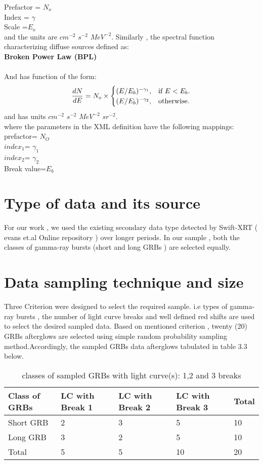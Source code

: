 Prefactor = $N_{o}$\\
Index = $\gamma$\\
Scale =$E_{o}$\\
and the units are $ cm^{-2} $ $s^{-2}$ $ MeV^{-2} $. Similarly , the spectral function characterizing  diffuse sources defined as:\\
\textbf{ Broken Power Law (BPL) }\\\\
And has function of  the form:
\begin{equation}
  \frac{dN}{dE}= N_{o} \times\begin{cases} 
    (E/E_{b}) ^{-\gamma_{1}}, & \text{if $ E < E_{b}$}.\\
    (E/E_{b})^{-\gamma_{2}}, & \text{otherwise}.
  \end{cases}
\end{equation}
and has units $ cm^{-2} $ $s^{-2}$ $ MeV^{-2} $ $ sr^{-2} $.\\
where the parameters in the XML definition have the following mappings:\\
   prefactor= $N_{O}$\\
$ index_{1}$= $\gamma_1 $\\
$index_{2}$= $\gamma_2 $\\
Break value=$ E_b $\\	
\section{Type of data  and its source }
For  our  work , we used  the existing  secondary data type  detected by  Swift-XRT   ( evans et.al Online repository )  over longer periods. In our sample , both the classes of gamma-ray bursts (short and long GRBs ) are selected equally. 
\section{Data sampling technique and size}
Three Criterion were  designed to select the required sample. i.e  types of gamma-ray bursts , the number of light curve breaks and well defined red shifts are used to select the desired sampled  data. Based on mentioned criterion ,  twenty (20) GRBs afterglows are selected using  simple random probability sampling method.Accordingly, the  sampled  GRBs data  afterglows  tabulated in table 3.3 below.
\begin{center}
	\begin{table}
		\caption { classes of sampled GRBs with light curve(s): 1,2 and 3 breaks }
		\begin{tabular}{|l|l|l|l|l|}
			\hline
			Class of GRBs & LC with Break 1 & LC with Break 2 & LC with Break 3 & Total \\ \hline
			Short GRB & 2 & 3 & 5 & 10 \\ \hline
			Long GRB & 3 & 2 & 5 & 10 \\ \hline
			Total & 5 & 5 & 10 & 20 \\ \hline
		\end{tabular}
	\end{table}
\end{center}
